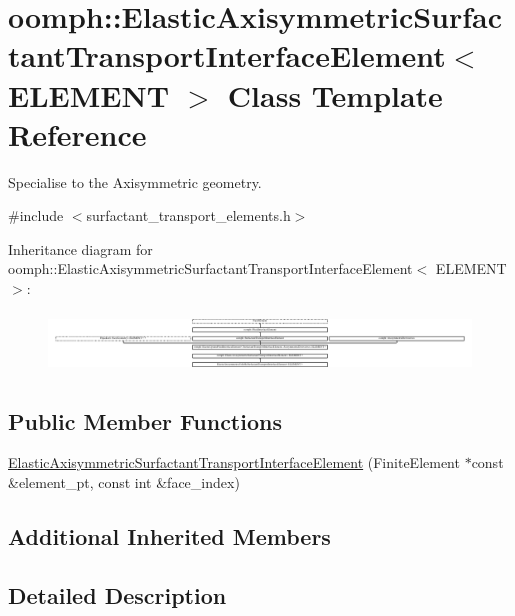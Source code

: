\hypertarget{classoomph_1_1ElasticAxisymmetricSurfactantTransportInterfaceElement}{}\section{oomph\+:\+:Elastic\+Axisymmetric\+Surfactant\+Transport\+Interface\+Element$<$ E\+L\+E\+M\+E\+NT $>$ Class Template Reference}
\label{classoomph_1_1ElasticAxisymmetricSurfactantTransportInterfaceElement}


Specialise to the Axisymmetric geometry.  




{\ttfamily \#include $<$surfactant\+\_\+transport\+\_\+elements.\+h$>$}

Inheritance diagram for oomph\+:\+:Elastic\+Axisymmetric\+Surfactant\+Transport\+Interface\+Element$<$ E\+L\+E\+M\+E\+NT $>$\+:\begin{figure}[H]
\begin{center}
\leavevmode
\includegraphics[height=1.588653cm]{classoomph_1_1ElasticAxisymmetricSurfactantTransportInterfaceElement}
\end{center}
\end{figure}
\subsection*{Public Member Functions}
\begin{DoxyCompactItemize}
\item 
\hyperlink{classoomph_1_1ElasticAxisymmetricSurfactantTransportInterfaceElement_a7e0f4dbf25bf0556a2675e599eeb6365}{Elastic\+Axisymmetric\+Surfactant\+Transport\+Interface\+Element} (Finite\+Element $\ast$const \&element\+\_\+pt, const int \&face\+\_\+index)
\end{DoxyCompactItemize}
\subsection*{Additional Inherited Members}


\subsection{Detailed Description}
